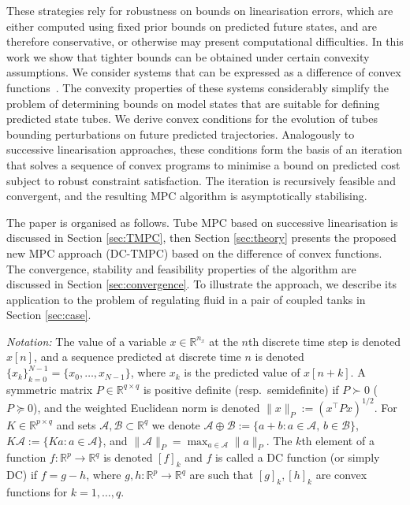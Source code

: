 \documentclass[a4paper, 10 pt, conference]{IEEEconf}
\def\RR{\mathbb{R}}
\def\NN{\mathbb{N}}
\def\A{\mathcal{A}}
\def\B{\mathcal{B}}
\begin{document}
These strategies rely for robustness on bounds on linearisation errors, which are either computed using fixed prior bounds on predicted future states, and are therefore conservative, or otherwise may present computational difficulties. In this work we show that tighter bounds can be obtained under certain convexity assumptions. We consider systems that can be expressed as a difference of convex functions~\cite{horst99:dcprog,hartman59:dcfun}. 
The convexity properties of these systems considerably simplify the problem of determining bounds on model states that are suitable for defining predicted state tubes. We derive convex conditions for the evolution of tubes bounding perturbations on future predicted trajectories. Analogously to successive linearisation approaches, these conditions form the basis of an iteration that solves a sequence of convex programs to minimise a bound on predicted cost subject to robust constraint satisfaction. The iteration is recursively feasible and convergent, and the resulting MPC algorithm is asymptotically stabilising. 

The paper is organised as follows. 
Tube MPC based on successive linearisation is discussed in Section  \ref{sec:TMPC}, then Section \ref{sec:theory} presents the proposed new MPC approach (DC-TMPC) based on the difference of convex functions. The convergence, stability and feasibility properties of the algorithm are discussed in Section  \ref{sec:convergence}. To illustrate the approach, we describe its application to the problem of regulating fluid in a pair of coupled tanks in Section \ref{sec:case}. 

\textit{Notation:}
The value of a variable $x\in \RR^{n_{x}}$ at the $n$th discrete time step is denoted $x[n]$, and a sequence predicted at discrete time $n$ is denoted %
$\{x_{k}\}_{k=0}^{N-1}=\{ x_{0} , \ldots, x_{N-1}\}$, 
where $x_{k}$ is the predicted value of $x[n+k]$.
%
A symmetric matrix $P\in\RR^{q\times q}$ is positive definite (resp.~semidefinite)  if ${P\succ 0}$ ($P\succeq 0$), and the weighted Euclidean norm is denoted $\lVert x\rVert_P := (x^\top P x)^{1/2}$.
%
For $K\in\RR^{p\times q}$ and sets $\A,\B\subset\RR^{q}$ we denote $\A \oplus \B := \{a + b : a \in \A, \, b \in \B\}$, $ K \A := \{K a : a \in \A \}$, and $\lVert \A \rVert_P = \max_{a\in\A} \lVert a \rVert_P$.
%
The $k$th element of a function $f:\RR^p\to\RR^q$ is denoted $[f]_k$ and $f$ is called a DC function (or simply DC) if $f = g - h$, where $g,h:\RR^p\to\RR^q$ are such that $[g]_k,[h]_k$ are convex functions for $k=1,\ldots,q$.
\end{document}
